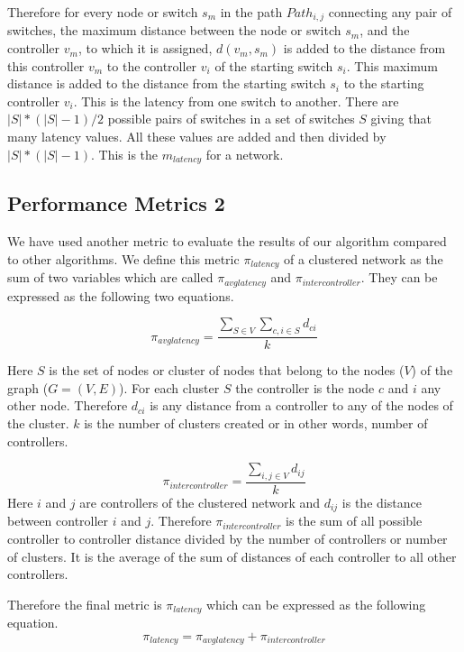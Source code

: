 \documentclass[10pt]{extarticle}
\begin{document}
	Therefore for every node or switch $s_m$ in the path $Path_{i,j}$ connecting any pair of switches, the maximum distance between the node or switch $s_m$, and the controller $v_m$, to which it is assigned, $d(v_m,s_m)$ is added to the distance from this controller $v_m$ to the controller $v_i$ of the starting switch $s_i$. This maximum distance is added to the distance from the starting switch $s_i$ to the starting controller $v_i$. This is the latency from one switch to another. There are $|S|*(|S|-1)/2$ possible pairs of switches in a set of switches $S$ giving that many latency values. All these values are added and then divided by $|S|*(|S|-1)$. This is the $m_{latency}$ for a network.
	
	\subsection{Performance Metrics 2} \label{myperfm}
	We have used another metric to evaluate the results of our algorithm compared to other algorithms. We define this metric $\pi_{latency}$ of a clustered network as the sum of two variables which are called $\pi_{avglatency}$ and $\pi_{intercontroller}$. They can be expressed as the following two equations.
	
	\begin{equation}
	\pi_{avglatency}=\frac{\sum_{S\in V}\sum_{c,i\in S}d_{ci}}{k}
	\end{equation}
	
	Here $S$ is the set of nodes or cluster of nodes that belong to the nodes ($V$) of the graph ($G=(V,E)$). For each cluster $S$ the controller is the node $c$ and $i$ any other node. Therefore $d_{ci}$ is any distance from a controller to any of the nodes of the cluster. $k$ is the number of clusters created or in other words, number of controllers.
	
	\begin{equation}
	\pi_{intercontroller}=\frac{\sum_{i,j\in V}d_{ij}}{k}
	\end{equation}
	Here $i$ and $j$ are controllers of the clustered network and $d_{ij}$ is the distance between controller $i$ and $j$. Therefore $\pi_{intercontroller}$ is the sum of all possible controller to controller distance divided by the number of controllers or number of clusters. It is the average of the sum of distances of each controller to all other controllers.
	
	Therefore the final metric is $\pi_{latency}$ which can be expressed as the following equation.
	\begin{equation}
	\pi_{latency} = \pi_{avglatency} + \pi_{intercontroller}
	\end{equation}
	
\end{document}
